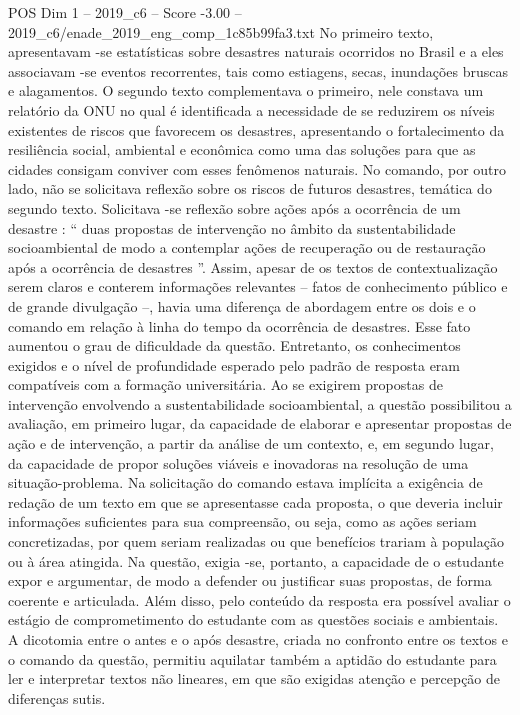 \begin{textsample}{POS Dim 1 – 2019\_c6 – Score -3.00 – 2019\_c6/enade\_2019\_eng\_comp\_1c85b99fa3.txt}
No primeiro texto, apresentavam -se estatísticas sobre desastres naturais ocorridos no Brasil e a eles associavam -se eventos recorrentes, tais como estiagens, secas, inundações bruscas e alagamentos.
O segundo texto complementava o primeiro, nele constava um relatório da ONU no qual é identificada a necessidade de se reduzirem os níveis existentes de riscos que favorecem os desastres, apresentando o fortalecimento da resiliência social, ambiental e econômica como uma das soluções para que as cidades consigam conviver com esses fenômenos naturais.
No comando, por outro lado, não se solicitava reflexão sobre os riscos de futuros desastres, temática do segundo texto.
Solicitava -se reflexão sobre ações após a ocorrência de um desastre : “ duas propostas de intervenção no âmbito da sustentabilidade socioambiental de modo a contemplar ações de recuperação ou de restauração após a ocorrência de desastres ”.
Assim, apesar de os textos de contextualização serem claros e conterem informações relevantes – fatos de conhecimento público e de grande divulgação –, havia uma diferença de abordagem entre os dois e o comando em relação à linha do tempo da ocorrência de desastres.
Esse fato aumentou o grau de dificuldade da questão.
Entretanto, os conhecimentos exigidos e o nível de profundidade esperado pelo padrão de resposta eram compatíveis com a formação universitária.
Ao se exigirem propostas de intervenção envolvendo a sustentabilidade socioambiental, a questão possibilitou a avaliação, em primeiro lugar, da capacidade de elaborar e apresentar propostas de ação e de intervenção, a partir da análise de um contexto, e, em segundo lugar, da capacidade de propor soluções viáveis e inovadoras na resolução de uma situação-problema.
Na solicitação do comando estava implícita a exigência de redação de um texto em que se apresentasse cada proposta, o que deveria incluir informações suficientes para sua compreensão, ou seja, como as ações seriam concretizadas, por quem seriam realizadas ou que benefícios trariam à população ou à área atingida.
Na questão, exigia -se, portanto, a capacidade de o estudante expor e argumentar, de modo a defender ou justificar suas propostas, de forma coerente e articulada.
Além disso, pelo conteúdo da resposta era possível avaliar o estágio de comprometimento do estudante com as questões sociais e ambientais.
A dicotomia entre o antes e o após desastre, criada no confronto entre os textos e o comando da questão, permitiu aquilatar também a aptidão do estudante para ler e interpretar textos não lineares, em que são exigidas atenção e percepção de diferenças sutis.

\end{textsample}
